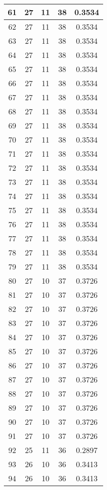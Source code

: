 \documentclass[letterpaper, 12pt]{article}
\begin{document}
\begin{longtable}{|c|c|c|c|c|}
\hline
61 & 27 & 11 & 38 & 0.3534 \\
\hline
62 & 27 & 11 & 38 & 0.3534 \\
\hline
63 & 27 & 11 & 38 & 0.3534 \\
\hline
64 & 27 & 11 & 38 & 0.3534 \\
\hline
65 & 27 & 11 & 38 & 0.3534 \\
\hline
66 & 27 & 11 & 38 & 0.3534 \\
\hline
67 & 27 & 11 & 38 & 0.3534 \\
\hline
68 & 27 & 11 & 38 & 0.3534 \\
\hline
69 & 27 & 11 & 38 & 0.3534 \\
\hline
70 & 27 & 11 & 38 & 0.3534 \\
\hline
71 & 27 & 11 & 38 & 0.3534 \\
\hline
72 & 27 & 11 & 38 & 0.3534 \\
\hline
73 & 27 & 11 & 38 & 0.3534 \\
\hline
74 & 27 & 11 & 38 & 0.3534 \\
\hline
75 & 27 & 11 & 38 & 0.3534 \\
\hline
76 & 27 & 11 & 38 & 0.3534 \\
\hline
77 & 27 & 11 & 38 & 0.3534 \\
\hline
78 & 27 & 11 & 38 & 0.3534 \\
\hline
79 & 27 & 11 & 38 & 0.3534 \\
\hline
80 & 27 & 10 & 37 & 0.3726 \\
\hline
81 & 27 & 10 & 37 & 0.3726 \\
\hline
82 & 27 & 10 & 37 & 0.3726 \\
\hline
83 & 27 & 10 & 37 & 0.3726 \\
\hline
84 & 27 & 10 & 37 & 0.3726 \\
\hline
85 & 27 & 10 & 37 & 0.3726 \\
\hline
86 & 27 & 10 & 37 & 0.3726 \\
\hline
87 & 27 & 10 & 37 & 0.3726 \\
\hline
88 & 27 & 10 & 37 & 0.3726 \\
\hline
89 & 27 & 10 & 37 & 0.3726 \\
\hline
90 & 27 & 10 & 37 & 0.3726 \\
\hline
91 & 27 & 10 & 37 & 0.3726 \\
\hline
92 & 25 & 11 & 36 & 0.2897 \\
\hline
93 & 26 & 10 & 36 & 0.3413 \\
\hline
94 & 26 & 10 & 36 & 0.3413 \\

\end{longtable}
\end{document}
